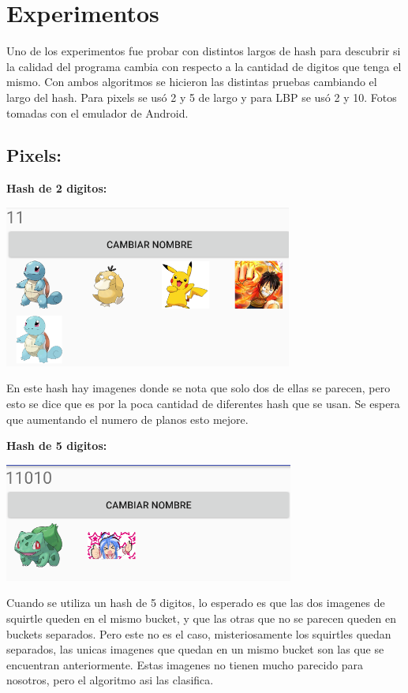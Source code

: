 \documentclass[12pt,twocolumn,letterpaper]{article}
\begin{document}
\section{Experimentos}
Uno de los experimentos fue probar con distintos largos de hash para descubrir si la calidad del programa cambia con respecto a la cantidad de digitos que tenga el mismo. Con ambos algoritmos se hicieron las distintas pruebas cambiando el largo del hash. Para pixels se us\'o 2 y 5 de largo y para LBP se us\'o 2 y 10.
Fotos tomadas con el emulador de Android.

\subsection{\textbf{Pixels:}}

\textbf{Hash de 2 digitos:}

\includegraphics{pix2}

En este hash hay imagenes donde se nota que solo dos de ellas se parecen, pero esto se dice que es por la poca cantidad de diferentes hash que se usan. Se espera que aumentando el numero de planos esto mejore.

\textbf{Hash de 5 digitos:}

\includegraphics{pix5}

Cuando se utiliza un hash de 5 digitos, lo esperado es que las dos imagenes de squirtle queden en el mismo bucket, y que las otras que no se parecen queden en buckets separados. Pero este no es el caso, misteriosamente los squirtles quedan separados, las unicas imagenes que quedan en un mismo bucket son las que se encuentran anteriormente. Estas imagenes no tienen mucho parecido para nosotros, pero el algoritmo asi las clasifica.
\end{document}
